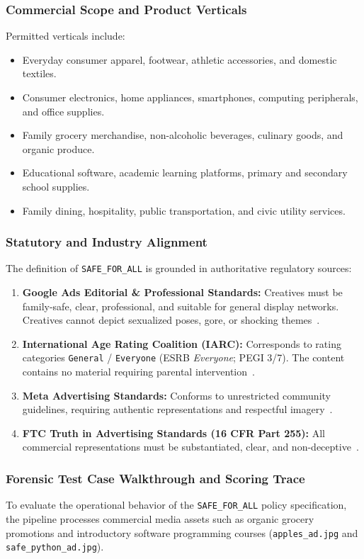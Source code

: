 \documentclass[12pt,a4paper]{report}
\begin{document}
\subsubsection{Commercial Scope and Product Verticals}
Permitted verticals include:
\begin{itemize}
    \item Everyday consumer apparel, footwear, athletic accessories, and domestic textiles.
    \item Consumer electronics, home appliances, smartphones, computing peripherals, and office supplies.
    \item Family grocery merchandise, non-alcoholic beverages, culinary goods, and organic produce.
    \item Educational software, academic learning platforms, primary and secondary school supplies.
    \item Family dining, hospitality, public transportation, and civic utility services.
\end{itemize}

\subsubsection{Statutory and Industry Alignment}
The definition of \texttt{SAFE\_FOR\_ALL} is grounded in authoritative regulatory sources:
\begin{enumerate}
    \item \textbf{Google Ads Editorial \& Professional Standards:} Creatives must be family-safe, clear, professional, and suitable for general display networks. Creatives cannot depict sexualized poses, gore, or shocking themes~\cite{googleadspolicy}.
    \item \textbf{International Age Rating Coalition (IARC):} Corresponds to rating categories \texttt{General} / \texttt{Everyone} (ESRB \emph{Everyone}; PEGI 3/7). The content contains no material requiring parental intervention~\cite{iarcratings}.
    \item \textbf{Meta Advertising Standards:} Conforms to unrestricted community guidelines, requiring authentic representations and respectful imagery~\cite{metaads}.
    \item \textbf{FTC Truth in Advertising Standards (16 CFR Part 255):} All commercial representations must be substantiated, clear, and non-deceptive~\cite{ftc2023guides}.
\end{enumerate}

\subsubsection{Forensic Test Case Walkthrough and Scoring Trace}
To evaluate the operational behavior of the \texttt{SAFE\_FOR\_ALL} policy specification, the pipeline processes commercial media assets such as organic grocery promotions and introductory software programming courses (\texttt{apples\_ad.jpg} and \texttt{safe\_python\_ad.jpg}).
\end{document}
